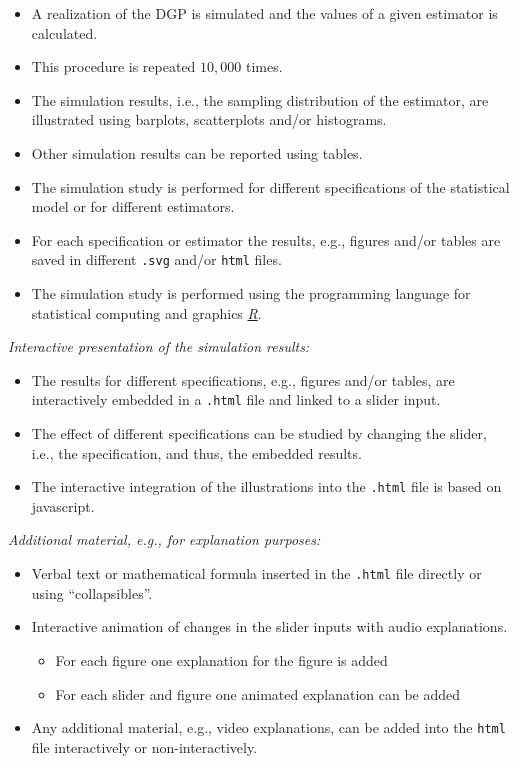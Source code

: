\documentclass{article}
\begin{document}
\begin{itemize}
	\item A realization of the DGP is simulated and the values of a given estimator is calculated.
	\item This procedure is repeated $10,000$ times. 
	\item The simulation results, i.e., the sampling distribution of the estimator, are illustrated using  barplots, scatterplots and/or histograms.
	\item Other simulation results can be reported using tables.
	\item The simulation study is performed for different specifications of the statistical model or for different estimators.
	\item For each specification or estimator the results, e.g., figures and/or tables are saved in different \texttt{.svg} and/or \texttt{html} files.
	\item The simulation study is performed using the programming language for statistical computing and graphics \href{https://www.r-project.org/}{\emph{R}}.	
\end{itemize}

\emph{Interactive presentation of the simulation results:}

\begin{itemize}
	\item The results for different specifications, e.g., figures and/or tables, are interactively embedded in a \texttt{.html} file and linked to a slider input.
	\item The effect of different specifications can be studied by changing the slider, i.e., the specification, and thus, the embedded results.
	\item The interactive integration of the illustrations into the \texttt{.html} file is based on javascript.
\end{itemize}

\emph{Additional material, e.g., for explanation purposes:}

\begin{itemize}
	\item Verbal text or mathematical formula inserted in the \texttt{.html} file directly or using ``collapsibles''.
	\item Interactive animation of changes in the slider inputs with audio explanations.
	\begin{itemize}
		\item For each figure one explanation for the figure is added
		\item For each slider and figure one animated explanation can be added
	\end{itemize}	
	\item Any additional material, e.g., video explanations, can be added into the \texttt{html} file interactively or non-interactively.
\end{itemize}
\end{document}
